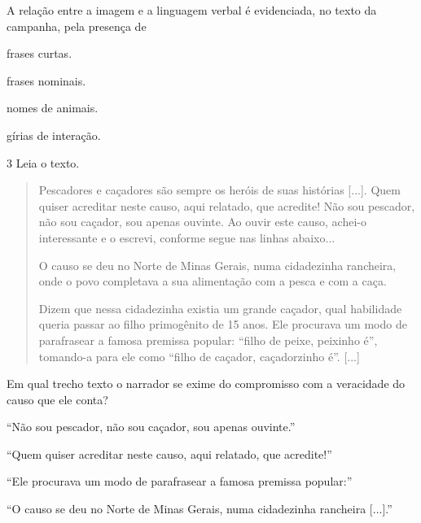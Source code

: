 A relação entre a imagem e a linguagem verbal é evidenciada, no texto da
campanha, pela presença de

\begin{escolha}
\item frases curtas.

\item frases nominais.

\item nomes de animais.

\item gírias de interação.
\end{escolha}

\num{3} Leia o texto.

\begin{quote}
Pescadores e caçadores são sempre os heróis de suas histórias {[}...{]}.
Quem quiser acreditar neste causo, aqui relatado, que acredite! Não sou
pescador, não sou caçador, sou apenas ouvinte. Ao ouvir este causo,
achei-o interessante e o escrevi, conforme segue nas linhas abaixo...

O causo se deu no Norte de Minas Gerais, numa cidadezinha rancheira,
onde o povo completava a sua alimentação com a pesca e com a caça.

Dizem que nessa cidadezinha existia um grande caçador, qual habilidade
queria passar ao filho primogênito de 15 anos. Ele procurava um modo de
parafrasear a famosa premissa popular: ``filho de peixe, peixinho é'',
tomando-a para ele como ``filho de caçador, caçadorzinho é''. {[}...{]}
\end{quote}


Em qual trecho texto o narrador se exime do compromisso com a veracidade
do causo que ele conta?

\begin{escolha}
\item ``Não sou pescador, não sou caçador, sou apenas ouvinte.''

\item ``Quem quiser acreditar neste causo, aqui relatado, que acredite!''

\item ``Ele procurava um modo de parafrasear a famosa premissa popular:''

\item ``O causo se deu no Norte de Minas Gerais, numa cidadezinha rancheira
{[}...{]}.''
\end{escolha}

